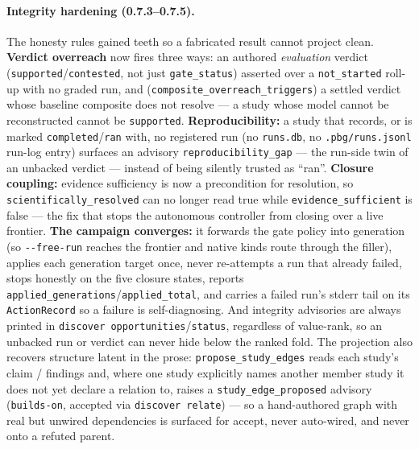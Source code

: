 \documentclass[11pt]{article}
\newcommand{\code}[1]{\texttt{\small #1}}
\begin{document}
\paragraph{Integrity hardening (0.7.3--0.7.5).} The honesty rules gained teeth so a fabricated
result cannot project clean. \textbf{Verdict overreach} now fires three ways: an authored
\emph{evaluation} verdict (\code{supported}/\code{contested}, not just \code{gate\_status}) asserted
over a \code{not\_started} roll-up with no graded run, and (\code{composite\_overreach\_triggers}) a
settled verdict whose baseline composite does not resolve --- a study whose model cannot be
reconstructed cannot be \code{supported}. \textbf{Reproducibility:} a study that records, or is marked
\code{completed}/\code{ran} with, no registered run (no \code{runs.db}, no \code{.pbg/runs.jsonl}
run-log entry) surfaces an advisory \code{reproducibility\_gap} --- the run-side twin of an unbacked
verdict --- instead of being silently trusted as ``ran''. \textbf{Closure coupling:} evidence
sufficiency is now a precondition for resolution, so \code{scientifically\_resolved} can no longer read
true while \code{evidence\_sufficient} is false --- the fix that stops the autonomous controller from
closing over a live frontier. \textbf{The campaign converges:} it forwards the gate policy into
generation (so \code{-{}-free-run} reaches the frontier and native kinds route through the filler),
applies each generation target once, never re-attempts a run that already failed, stops honestly on
the five closure states, reports \code{applied\_generations}/\code{applied\_total}, and carries a failed
run's stderr tail on its \code{ActionRecord} so a failure is self-diagnosing. And integrity advisories
are always printed in \code{discover opportunities}/\code{status}, regardless of value-rank, so an
unbacked run or verdict can never hide below the ranked fold. The projection also recovers structure
latent in the prose: \code{propose\_study\_edges} reads each study's claim / findings and, where one
study explicitly names another member study it does not yet declare a relation to, raises a
\code{study\_edge\_proposed} advisory (\code{builds-on}, accepted via \code{discover relate}) --- so a
hand-authored graph with real but unwired dependencies is surfaced for accept, never auto-wired, and
never onto a refuted parent.
\end{document}
